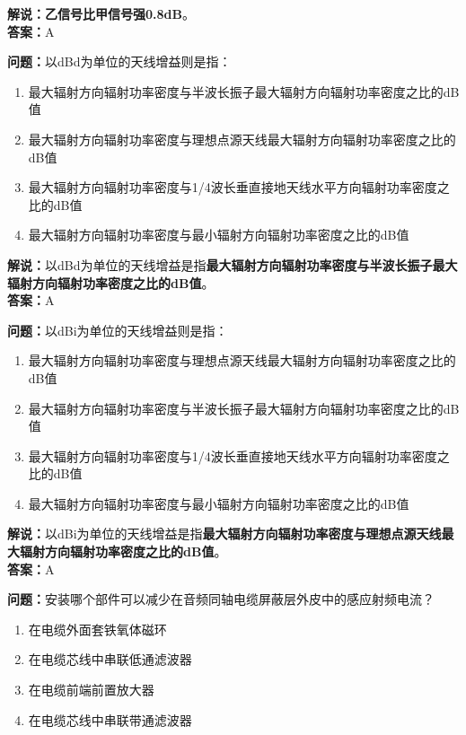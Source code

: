 \textbf{解说：乙信号比甲信号强0.8dB}。\\\textbf{答案：}A



\textbf{问题：}以dBd为单位的天线增益则是指：

\begin{enumerate}[label=\Alph*), leftmargin=1cm]
	\item 最大辐射方向辐射功率密度与半波长振子最大辐射方向辐射功率密度之比的dB值
	\item 最大辐射方向辐射功率密度与理想点源天线最大辐射方向辐射功率密度之比的dB值
	\item 最大辐射方向辐射功率密度与1/4波长垂直接地天线水平方向辐射功率密度之比的dB值
	\item 最大辐射方向辐射功率密度与最小辐射方向辐射功率密度之比的dB值
\end{enumerate}

\textbf{解说：}以dBd为单位的天线增益是指\textbf{最大辐射方向辐射功率密度与半波长振子最大辐射方向辐射功率密度之比的dB值}。\\\textbf{答案：}A



\textbf{问题：}以dBi为单位的天线增益则是指：
\begin{enumerate}[label=\Alph*), leftmargin=1cm]
	\item 最大辐射方向辐射功率密度与理想点源天线最大辐射方向辐射功率密度之比的dB值
	\item 最大辐射方向辐射功率密度与半波长振子最大辐射方向辐射功率密度之比的dB值
	\item 最大辐射方向辐射功率密度与1/4波长垂直接地天线水平方向辐射功率密度之比的dB值
	\item 最大辐射方向辐射功率密度与最小辐射方向辐射功率密度之比的dB值
\end{enumerate}

\textbf{解说：}以dBi为单位的天线增益是指\textbf{最大辐射方向辐射功率密度与理想点源天线最大辐射方向辐射功率密度之比的dB值}。\\\textbf{答案：}A



\textbf{问题：}安装哪个部件可以减少在音频同轴电缆屏蔽层外皮中的感应射频电流？

\begin{enumerate}[label=\Alph*), leftmargin=1cm]
	\item 在电缆外面套铁氧体磁环
	\item 在电缆芯线中串联低通滤波器
	\item 在电缆前端前置放大器
	\item 在电缆芯线中串联带通滤波器
\end{enumerate}

